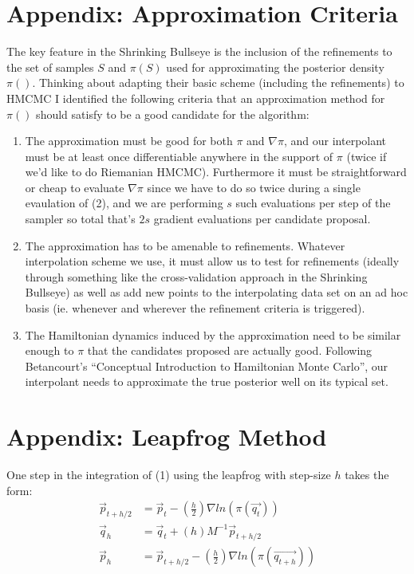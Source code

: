 \documentclass[12pt,a4paper]{article}
\begin{document}
\section{Appendix: Approximation Criteria}
The key feature in the Shrinking Bullseye is the inclusion of the refinements to the set of samples $S$ and $\pi(S)$ used for approximating the posterior density $\pi()$.  Thinking about adapting their basic scheme (including the refinements) to HMCMC I identified the following criteria that an approximation method for $\pi()$ should satisfy to be a good candidate for the algorithm:
\begin{enumerate}
\item The approximation must be good for both $\pi$ and $\nabla \pi$, and our interpolant must be at least once differentiable anywhere in the support of $\pi$ (twice if we’d like to do Riemanian HMCMC). Furthermore it must be straightforward or cheap to evaluate $\nabla \pi$ since we have to do so twice during a single evaulation of (2), and we are performing $s$ such evaluations per step of the sampler so total that’s $2s$ gradient evaluations per candidate proposal.
\item The approximation has to be amenable to refinements. Whatever interpolation scheme  we use, it must allow us to test for refinements (ideally through something like the cross-validation approach in the Shrinking Bullseye) as well as add new points to the interpolating data set on an ad hoc basis (ie. whenever and wherever the refinement criteria is triggered).
\item  The Hamiltonian dynamics induced by the approximation  need to be similar enough to $\pi$ that the candidates proposed are actually good. Following Betancourt’s “Conceptual Introduction to Hamiltonian Monte Carlo”, our interpolant needs to approximate the true posterior well on its typical set.
\end{enumerate}

\section{Appendix: Leapfrog Method}
One step in the integration of (1) using the leapfrog with step-size $h$ takes the form:
\begin{equation}
\begin{split}
\vec{p}_{t+h/2} &= \vec{p}_t - (\frac{h}{2})  \nabla ln(\pi(\vec{q_t}))\\
\vec{q}_h &= \vec{q}_t + (h)M^{-1} \vec{p}_{t+h/2} \\
\vec{p}_h &= \vec{p}_{t+h/2} - (\frac{h}{2})  \nabla ln(\pi(\vec{q_{t+h}})) \\
\end{split}
\end{equation}

\printbibliography
\end{document}
